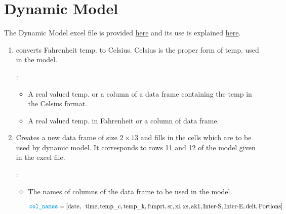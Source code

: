 	\section{Dynamic Model}

The Dynamic Model excel file is provided 
\href{http://ucanr.edu/sites/fruittree/How-to_Guides/Dynamic_Model_-_Chill_Accumulation/}{here} and its use is explained 
\href{http://ucanr.edu/sites/fruittree/files/49320.pdf}{here}.


\begin{enumerate}
\item {} converts Fahrenheit temp. to Celsius. Celsius is the proper form of temp. used in the model. 

:
\begin{itemize}
\item {}  A real valued temp. or a column of a 
data frame containing the temp in the Celsius format.
\end{itemize}


\begin{itemize}
\item A real valued temp. in Fahrenheit or a column of
data frame.
\end{itemize}


\item {} Creates a new data frame 
of size $2 \times 13$ and fills in the cells which are to be used
by dynamic model. It corresponds to rows 11 and 12 of the 
model given in the excel file.

:

\begin{itemize}
\item {}  The names of columns of the data frame to be used in the model.

{\footnotesize {$ \vari{col\_names} = [ \text{date}, \:
                                    \text{ time}, 
                                     \text{temp\_c}, 
                                     \text{temp\_k}, 
                                     \text{ftmprt}, 
                                     \text{sr}, 
                                     \text{xi}, 
                                     \text{xs}, 
                                     \text{ak1}, 
                                     \text{Inter-S}, 
                                     \text{Inter-E},
                                     \text{delt}, 
                                     \text{Portions}] $}}


\end{itemize}
\end{enumerate}
